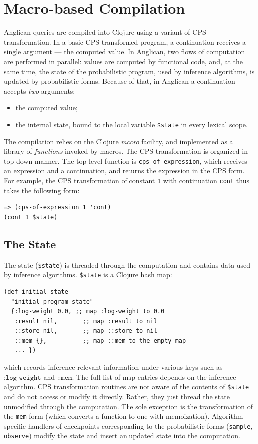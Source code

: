 \documentclass[sigconf]{acmart}
\begin{document}
\section{Macro-based Compilation}
\label{sec:compilation}

Anglican queries are compiled into Clojure using a variant of CPS
transformation. In a basic CPS-transformed program, a
continuation receives a single argument --- the computed value.
In Anglican, two flows of computation are performed in
parallel: values are computed by functional code, and,
at the same time, the state of the probabilistic program,
used by inference algorithms, is updated by
probabilistic forms. Because of that, in Anglican a continuation
accepts  \textit{two} arguments:
\begin{itemize}
    \item the computed value;
    \item the internal state, bound to the local variable
        \texttt{\$state} in every lexical scope.
\end{itemize}

The compilation relies on the Clojure \textit{macro} facility,
and implemented as a library of
\textit{functions}\iftoggle{full}{ in namespace
\texttt{anglican.trap}, which are}{} invoked by macros.  The CPS
transformation is organized in top-down manner.  The top-level
function is  \texttt{cps-of-expression}, which receives an
expression and a continuation, and returns the expression in the
CPS form. For example, the CPS transformation of constant
\texttt{1} with continuation \texttt{cont} thus takes the
following form:
\begin{lstlisting}[style=default]
=> (cps-of-expression 1 'cont)
(cont 1 $state)
\end{lstlisting}

\subsection {The State}
\label{sec:state}

The state (\texttt{\$state}) is threaded through the computation
and contains data used by inference algorithms. \texttt{\$state}
is a Clojure hash map:
\begin{lstlisting}[style=default]
(def initial-state
  "initial program state"
  {:log-weight 0.0, ;; map :log-weight to 0.0
   :result nil,       ;; map :result to nil
   ::store nil,       ;; map ::store to nil
   ::mem {},          ;; map ::mem to the empty map 
   ... })
\end{lstlisting}
which records inference-relevant information under various keys such
as $\texttt{:log-weight}$ and $\texttt{::mem}$. The full list of map
entries depends on the inference algorithm. CPS transformation
routines are not aware of the contents of \texttt{\$state} and do not
access or modify it directly. Rather, they just thread the state
unmodified through the computation. The sole exception is the
transformation of  the \texttt{mem} form (which converts a function
to one with memoization). Algorithm-specific handlers of checkpoints
corresponding to the probabilistic forms (\texttt{sample},
\texttt{observe}) modify the state and insert an updated state into
the computation.
\end{document}
